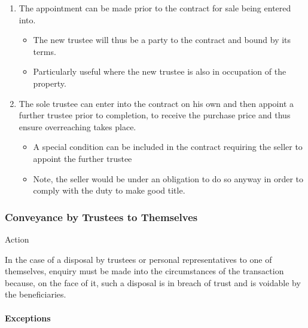 \documentclass[
]{article}
\providecommand{\tightlist}{%
  \setlength{\itemsep}{0pt}\setlength{\parskip}{0pt}}
\newenvironment{env-a1c35d52-c355-4524-93c6-325e9133bd60}
{
    \savenotes\tcolorbox[blanker,breakable,left=5pt,borderline west={2pt}{-4pt}{aquamarine}]
}
{
    \endtcolorbox\spewnotes
}
\begin{document}
\begin{enumerate}
\tightlist
\item
  The appointment can be made prior to the contract for sale being
  entered into.

  \begin{itemize}
  \tightlist
  \item
    The new trustee will thus be a party to the contract and bound by
    its terms.
  \item
    Particularly useful where the new trustee is also in occupation of
    the property.
  \end{itemize}
\item
  The sole trustee can enter into the contract on his own and then
  appoint a further trustee prior to completion, to receive the purchase
  price and thus ensure overreaching takes place.

  \begin{itemize}
  \tightlist
  \item
    A special condition can be included in the contract requiring the
    seller to appoint the further trustee
  \item
    Note, the seller would be under an obligation to do so anyway in
    order to comply with the duty to make good title.
  \end{itemize}
\end{enumerate}

\hypertarget{conveyance-by-trustees-to-themselves}{%
\subsubsection{Conveyance by Trustees to
Themselves}\label{conveyance-by-trustees-to-themselves}}

\begin{env-a1c35d52-c355-4524-93c6-325e9133bd60}

Action

In the case of a disposal by trustees or personal representatives to one
of themselves, enquiry must be made into the circumstances of the
transaction because, on the face of it, such a disposal is in breach of
trust and is voidable by the beneficiaries.

\end{env-a1c35d52-c355-4524-93c6-325e9133bd60}

\hypertarget{exceptions}{%
\paragraph{Exceptions}\label{exceptions}}
\end{document}
